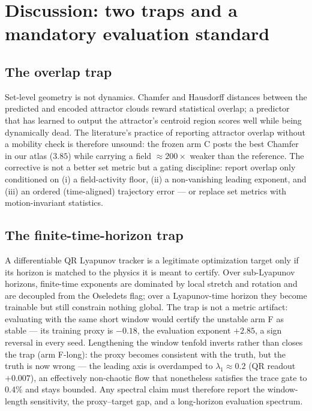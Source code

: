 \documentclass[11pt]{article}
\begin{document}
\section{Discussion: two traps and a mandatory evaluation standard}
\label{sec:discussion}

\subsection{The overlap trap}
Set-level geometry is not dynamics. Chamfer and Hausdorff distances
between the predicted and encoded attractor clouds reward statistical
overlap; a predictor that has learned to output the attractor's centroid
region scores well while being dynamically dead. The literature's
practice of reporting attractor overlap without a mobility check is
therefore unsound: the frozen arm C posts the best Chamfer in our atlas
($3.85$) while carrying a field $\approx200\times$ weaker than the
reference. The corrective is not a better set metric but a gating
discipline: report overlap only conditioned on (i) a field-activity
floor, (ii) a non-vanishing leading exponent, and (iii) an ordered
(time-aligned) trajectory error --- or replace set metrics with
motion-invariant statistics.

\subsection{The finite-time-horizon trap}
A differentiable QR Lyapunov tracker is a legitimate optimization target
only if its horizon is matched to the physics it is meant to certify.
Over sub-Lyapunov horizons, finite-time exponents are dominated by local
stretch and rotation and are decoupled from the Oseledets flag; over a
Lyapunov-time horizon they become trainable but still constrain nothing
global. The trap is not a metric artifact: evaluating with the same
short window would certify the unstable arm F as stable --- its training
proxy is $-0.18$, the evaluation exponent $+2.85$, a sign reversal in
every seed. Lengthening the window tenfold inverts rather than closes
the trap (arm F-long): the proxy becomes consistent with the truth, but
the truth is now wrong --- the leading axis is overdamped to
$\lambda_1\approx0.2$ (QR readout $+0.007$), an effectively non-chaotic
flow that nonetheless satisfies the trace gate to $0.4\%$ and stays
bounded. Any spectral claim must therefore report the window-length
sensitivity, the proxy--target gap, and a long-horizon evaluation
spectrum.
\end{document}

